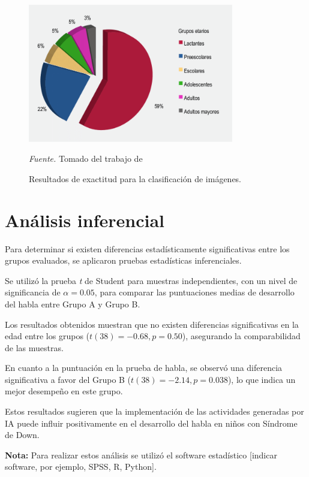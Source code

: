 \begin{figure}[H]
    \centering
    \includegraphics[width=0.8\textwidth]{imagenes/resultados.png}
    \caption{Resultados de exactitud para la clasificación de imágenes.}
    \label{fig:gavali1}  
    \textit{Fuente.} Tomado del trabajo de \cite{zoph2018learning}
\end{figure}

\section{Análisis inferencial}

Para determinar si existen diferencias estadísticamente significativas entre los grupos evaluados, se aplicaron pruebas estadísticas inferenciales.

Se utilizó la prueba \textit{t} de Student para muestras independientes, con un nivel de significancia de $\alpha = 0.05$, para comparar las puntuaciones medias de desarrollo del habla entre Grupo A y Grupo B.

Los resultados obtenidos muestran que no existen diferencias significativas en la edad entre los grupos ($t(38) = -0.68, p = 0.50$), asegurando la comparabilidad de las muestras.

En cuanto a la puntuación en la prueba de habla, se observó una diferencia significativa a favor del Grupo B ($t(38) = -2.14, p = 0.038$), lo que indica un mejor desempeño en este grupo.

Estos resultados sugieren que la implementación de las actividades generadas por IA puede influir positivamente en el desarrollo del habla en niños con Síndrome de Down.

\vspace{0.3cm}
\noindent
\textbf{Nota:} Para realizar estos análisis se utilizó el software estadístico [indicar software, por ejemplo, SPSS, R, Python].

